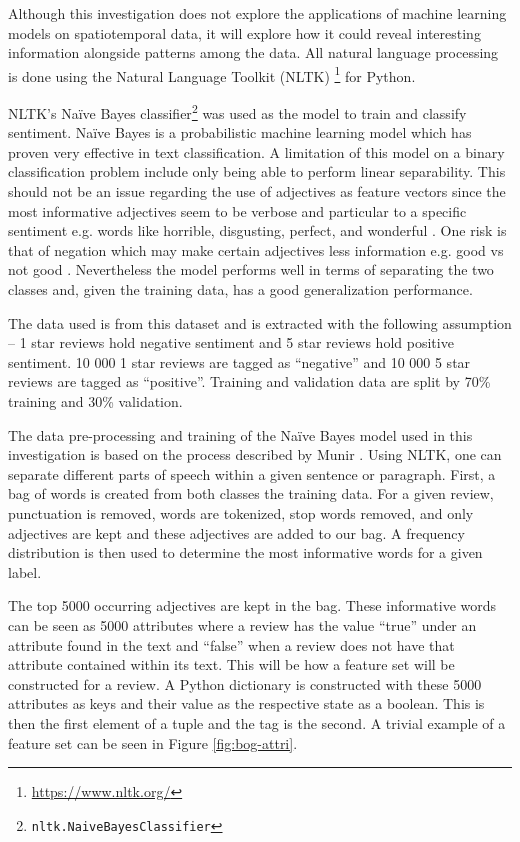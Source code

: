 Although this investigation does not explore the applications of machine learning models on
spatiotemporal data, it will explore how it could reveal interesting information alongside patterns
among the data. All natural language processing is done using the Natural Language Toolkit (NLTK)
\footnote{\url{https://www.nltk.org/}} for Python.

NLTK's Na\"ive Bayes classifier\footnote{\texttt{nltk.NaiveBayesClassifier}} was used as the model
to train and classify sentiment. Na\"ive Bayes is a probabilistic machine learning model which has
proven very effective in text classification. A limitation of this model on a binary classification
problem include only being able to perform linear separability. This should not be an issue
regarding the use of adjectives as feature vectors since the most informative adjectives seem to be
verbose and particular to a specific sentiment e.g. words like horrible, disgusting, perfect, and
wonderful \cite{rish2001empirical}. One risk is that of negation which may make certain adjectives
less information e.g. good vs not good \cite{blanco2011some}. Nevertheless the model performs well
in terms of separating the two classes and, given the training data, has a good generalization
performance.

The data used is from this dataset and is extracted with the following assumption -- 1 star reviews
hold negative sentiment and 5 star reviews hold positive sentiment. 10 000 1 star reviews are
tagged as ``negative'' and 10 000 5 star reviews are tagged as ``positive''. Training and
validation data are split by 70\% training and 30\% validation. 

The data pre-processing and training of the Na\"ive Bayes model used in this investigation is based
on the process described by Munir \cite{SamiraMunir}. Using NLTK, one can separate different parts
of speech within a given sentence or paragraph. First, a bag of words is created from both classes
the training data. For a given review, punctuation is removed, words are tokenized, stop words
removed, and only adjectives are kept and these adjectives are added to our bag. A frequency 
distribution is then used to determine the most informative words for a given label.

The top 5000 occurring adjectives are kept in the bag. These informative words can be seen as 
5000 attributes where a review has the value ``true'' under an attribute found in the text and
``false'' when a review does not have that attribute contained within its text. This will be 
how a feature set will be constructed for a review. A Python dictionary is constructed with
these 5000 attributes as keys and their value as the respective state as a boolean. This is
then the first element of a tuple and the tag is the second. A trivial example of a feature
set can be seen in Figure \ref{fig:bog-attri}.

